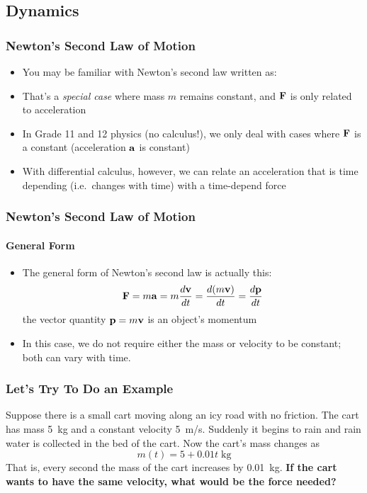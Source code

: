 \documentclass[12pt,compress,aspectratio=169]{beamer}
\newcommand{\mb}[1]{\ensuremath\mathbf{#1}}
\begin{document}
\subsection{Dynamics}
\begin{frame}
  \frametitle{Newton's Second Law of Motion}
  \begin{itemize}
  \item You may be familiar with Newton's second law written as:

    \vspace{-.1in}{\large
      \begin{displaymath}
        \mb{F}=m\mb{a}=m\frac{d\mb{v}}{dt}=m\frac{d^2\mb{s}}{dt^2}
      \end{displaymath}
    }
  \item That's a \emph{special case} where mass $m$ remains constant, and
    $\mb{F}$ is only related to acceleration
  \item In Grade 11 and 12 physics (no calculus!), we only deal with
    cases where $\mb{F}$ is a constant (acceleration $\mb{a}$ is constant)
  \item With differential calculus, however, we can relate an acceleration
    that is time depending (i.e.\ changes with time) with a time-depend force
  \end{itemize}
\end{frame}

\begin{frame}
  \frametitle{Newton's Second Law of Motion}
  \framesubtitle{General Form}
  \begin{itemize}
  \item The general form of Newton's second law is actually this:
    {\large 
      \begin{displaymath}
        \mb{F}=m\mb{a}=m\frac{d\mb{v}}{dt}=\frac{d(m\mb{v})}{dt}=
        \frac{d\mb{p}}{dt}
      \end{displaymath}
    }
    the vector quantity $\mb{p}=m\mb{v}$ is an object's momentum
  \item In this case, we do not require either the mass or velocity to be
    constant; both can vary with time.
  \end{itemize}
\end{frame}


\begin{frame}
  \frametitle{Let's Try To Do an Example}
  Suppose there is a small cart moving along an icy road with no friction. The
  cart has mass \SI{5}{kg} and a constant velocity \SI{5}{m/s}.
  Suddenly it begins to rain and rain water is collected in the bed of the
  cart. Now the cart's mass changes as
  \begin{displaymath}
    m(t)=5+0.01t\;\si{\kg}
  \end{displaymath}
  That is, every second the mass of the cart increases by \SI{0.01}{\kg}.
  \textbf{If the cart wants to have the same velocity, what would be the force
    needed?}
\end{frame}
\end{document}
